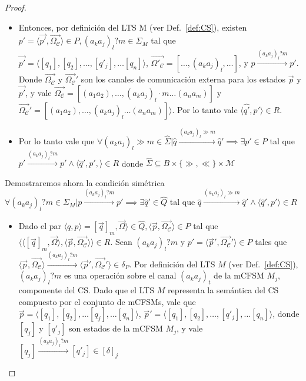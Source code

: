 \begin{proof}
\begin{itemize}
    \item Entonces, por definición del LTS M (ver Def.~\ref{def:CS}), existen $p'=\langle \overrightarrow{p'}, \overrightarrow{\Omega_\mathcal{C}} \rangle \in P, (a_ka_j)_l?m \in \Sigma_M$ tal que $\overrightarrow{p'}=\langle [q_1], [q_2], \ldots, [q'_j], \ldots [q_n] \rangle$, $\overrightarrow{\Omega'_\mathcal{C}}=[\ldots, (a_ka_j)_l, \ldots]$, y $p \xrightarrow{(a_ka_j)_l?m} p'$. Donde $\overrightarrow{\Omega_\mathcal{C}}$ y $\overrightarrow{\Omega_\mathcal{C}}'$ son los canales de comunicación externa para los estados $\overrightarrow{p}$ y $\overrightarrow{p'}$, y vale $\overrightarrow{\Omega_\mathcal{C}} = [(a_1a_2), \ldots, (a_ka_j)_l \cdot m \ldots (a_na_m)]$ y $\overrightarrow{\Omega_\mathcal{C}}' = [(a_1a_2), \ldots, (a_ka_j)_l \ldots (a_na_m)] \rangle$. Por lo tanto vale $\langle \widehat{q'}, p' \rangle \in R$.
    
    \item Por lo tanto vale que $\forall (a_ka_j)_l \gg m \in \widehat{\Sigma} | \widehat{q} \xrightarrow{(a_ka_j)_l \gg m} \widehat{q}' \implies \exists p' \in P$ tal que $p' \xrightarrow{(a_ka_j)_l?m} p' \land \langle \widehat{q}', p', \rangle \in R$ donde $\widehat{\Sigma} \subseteq B \times \{\gg,\ll\} \times \mathcal{M}$
  \end{itemize}
  
  Demostraremos ahora la condición simétrica $\forall (a_ka_j)_l?m \in \Sigma_M | p \xrightarrow{(a_ka_j)_l?m} p' \implies \exists \widehat{q}' \in \widehat{Q}$ tal que $\widehat{q} \xrightarrow{(a_ka_j)_l \gg m} \widehat{q}' \land \langle \widehat{q}', p'\rangle \in R$ 
  \begin{itemize}

     \item Dado el par $\langle q, p \rangle = [\overrightarrow{q}]_m, \overrightarrow{\Omega} \rangle \in \widehat{Q}, \langle \overrightarrow{p}, \overrightarrow{\Omega_\mathcal{C}} \rangle \in P$ tal que $\langle \langle [\overrightarrow{q}]_m, \overrightarrow{\Omega} \rangle, \langle \overrightarrow{p}, \overrightarrow{\Omega_\mathcal{C}} \rangle \rangle \in R$. Sean $(a_ka_j)_l?m$ y $p' = \langle \overrightarrow{p}', \overrightarrow{\Omega_\mathcal{C}}' \rangle \in P$ tales que $\langle \overrightarrow{p}, \overrightarrow{\Omega_\mathcal{C}} \rangle \xrightarrow{(a_ka_j)_l?m} \langle \overrightarrow{p}', \overrightarrow{\Omega_\mathcal{C}}' \rangle \in \delta_P$. Por definición del LTS $M$ (ver Def.~\ref{def:CS}), $(a_ka_j)_l?m$ es una operación sobre el canal $(a_ka_j)_t$ de la mCFSM $M_j$, componente del CS. Dado que el LTS $M$ representa la semántica del CS compuesto por el conjunto de mCFSMs, vale que $\overrightarrow{p}=\langle [q_1], [q_2], \ldots [q_j], \ldots [q_n] \rangle$, $\overrightarrow{p}'= \langle [q_1], [q_2], \ldots, [q'_j], \ldots [q_n] \rangle$, donde $[q_j]$ y $[q'_j]$ son estados de la mCFSM $M_j$, y vale $[q_j] \xrightarrow{(a_ka_j)_l?m} [q'_j] \in [\delta]_j$
    

\end{itemize}
\end{proof}
